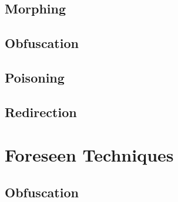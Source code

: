 \documentclass[11pt,fleqn,oneside]{book} %
\begin{document}
\chapter{Morphing} \label{ch:known-morphing}


\chapter{Obfuscation} \label{ch:known-obfuscation}


\newpage
\newpage
\chapter{Poisoning} \label{ch:known-poisoning}


\chapter{Redirection} \label{ch:known-redirection}


\newpage

\part{Foreseen Techniques}
\chapter{Obfuscation} \label{ch:foreseen-obfuscation}



\end{document}
